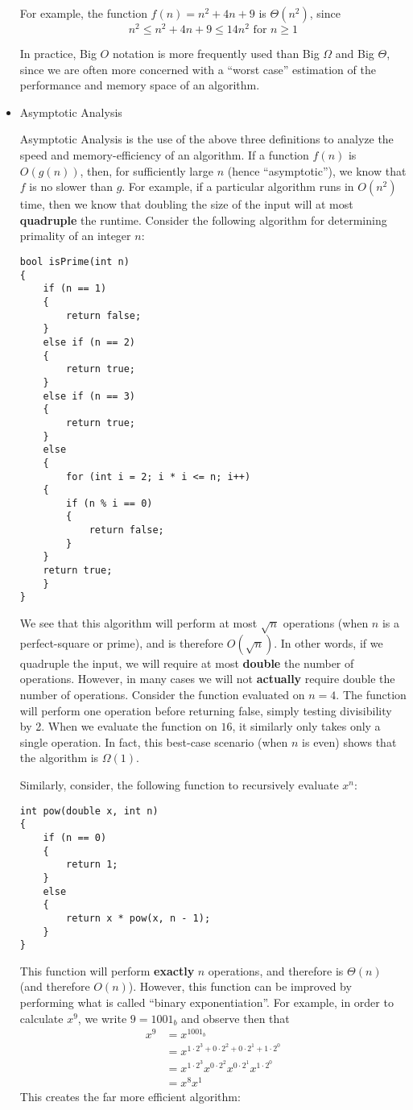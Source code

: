 \documentclass[a4paper]{article}
\begin{document}
\begin{itemize}
For example, the function $f(n)=n^2+4n+9$ is $\Theta(n^2)$, since \[n^2 \leq n^2+4n+9\leq14n^2\text{ for } n\geq1\]

In practice, Big $O$ notation is more frequently used than Big $\Omega$ and Big $\Theta$, since we are often more concerned with a ``worst case'' estimation of the performance and memory space of an algorithm.

\item Asymptotic Analysis

Asymptotic Analysis is the use of the above three definitions to analyze the speed and memory-efficiency of an algorithm. If a function $f(n)$ is $O(g(n))$, then, for sufficiently large $n$ (hence ``asymptotic''), we know that $f$ is no slower than $g$. For example, if a particular algorithm runs in $O(n^2)$ time, then we know that doubling the size of the input will at most \textbf{quadruple} the runtime. Consider the following algorithm for determining primality of an integer $n$:

\begin{verbatim}
bool isPrime(int n)
{
    if (n == 1)
    {
        return false;
    }
    else if (n == 2)
    {
        return true;
    }
    else if (n == 3)
    {
        return true;
    }
    else
    {
        for (int i = 2; i * i <= n; i++)
    {
        if (n % i == 0)
        {
            return false;
        }
    }
    return true;
    }
}
\end{verbatim}

We see that this algorithm will perform at most $\sqrt{n}$ operations (when $n$ is a perfect-square or prime), and is therefore $O(\sqrt{n})$. In other words, if we quadruple the input, we will require at most \textbf{double} the number of operations. However, in many cases we will not \textbf{actually} require double the number of operations. Consider the function evaluated on $n=4$. The function will perform one operation before returning false, simply testing divisibility by 2. When we evaluate the function on $16$, it similarly only takes only a single operation. In fact, this best-case scenario (when $n$ is even) shows that the algorithm is $\Omega(1)$. 

Similarly, consider, the following function to recursively evaluate $x^n$:
\begin{verbatim}
int pow(double x, int n)
{
	if (n == 0)
	{
		return 1;
	}
	else
    {
		return x * pow(x, n - 1);
    }
}
\end{verbatim}

This function will perform \textbf{exactly} $n$ operations, and therefore is $\Theta(n)$ (and therefore $O(n)$). However, this function can be improved by performing what is called ``binary exponentiation''. For example, in order to calculate $x^9$, we write $9=1001_b$ and observe then that\begin{align*}x^9&=x^{1001_b}\\&=x^{1\cdot2^3+0\cdot2^2+0\cdot2^1+1\cdot2^0}\\&=x^{1\cdot2^3}x^{0\cdot2^2}x^{0\cdot2^1}x^{1\cdot2^0}\\&=x^8x^1\end{align*} This creates the far more efficient algorithm:


\end{itemize}
\end{document}
